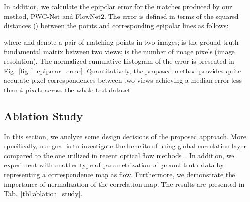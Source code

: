\documentclass[10pt,twocolumn,letterpaper]{article}
\begin{document}
In addition, we calculate the epipolar error for the matches produced by our method, PWC-Net and FlowNet2. The error is defined in terms of the squared distances () between the points and corresponding epipolar lines as follows:


\noindent where  and  denote a pair of matching points in two images;   is the ground-truth fundamental matrix between two views;  is the number of image pixels (image resolution). 
The normalized cumulative histogram of the error is presented in Fig.~\ref{fig:f_epipolar_error}. Quantitatively, the proposed method provides quite accurate pixel correspondences between two views achieving a median error less than 4 pixels across the whole test dataset.

\vspace{-1mm}
\subsection{Ablation Study}\label{ssec:ablation_study}
In this section, we analyze some design decisions of the proposed approach. More specifically, our goal is to investigate the benefits of using global correlation layer compared to the one utilized in recent optical flow methods~\cite{FlowNet2,PWC-Net}. In addition, we experiment with another type of parametrization of ground truth data by representing a correspondence map as flow. Furthermore, we demonstrate the importance of  normalization of the correlation map. The results are presented in Tab.~\ref{tbl:ablation_study}.
\end{document}
